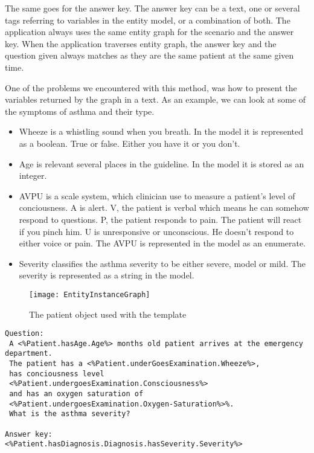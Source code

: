 The same goes for the answer key. The answer key can be a text, one or several tags referring to variables in the entity model, or a combination of both. The application always uses the same entity graph for the scenario and the answer key. When the application traverses entity graph, the answer key and the question given always matches as they are the same patient at the same given time.

One of the problems we encountered with this method, was how to present the variables returned by the graph in a text. As an example, we can look at some of the symptoms of asthma and their type.
\begin{itemize}
	\item Wheeze is a whistling sound when you breath. In the model it is represented as a boolean. True or false. Either you have it or you don't.
	\item Age is relevant several places in the guideline. In the model it is stored as an integer.
	\item AVPU is a scale system, which clinician use to measure a patient's level of conciousness. A is alert. V, the patient is verbal which means he can somehow respond to questions. P, the patient responds to pain. The patient will react if you pinch him. U is unresponsive or unconscious. He doesn't respond to either voice or pain. The AVPU is represented in the model as an enumerate.
	\item Severity classifies the asthma severity to be either severe, model or mild. The severity is represented as a string in the model.
\end{itemize}

\begin{figure}[h!]
	\caption {The patient object used with the template}
	\label{fig:EntityInstanceGraph}
	\texttt{[image: EntityInstanceGraph]}
\end{figure}

\begin{verbatim}
Question:
 A <%Patient.hasAge.Age%> months old patient arrives at the emergency department. 
 The patient has a <%Patient.underGoesExamination.Wheeze%>,
 has conciousness level 
 <%Patient.undergoesExamination.Consciousness%> 
 and has an oxygen saturation of 
 <%Patient.undergoesExamination.Oxygen-Saturation%>%. 
 What is the asthma severity? 
 
Answer key:
<%Patient.hasDiagnosis.Diagnosis.hasSeverity.Severity%>
\end{verbatim}

